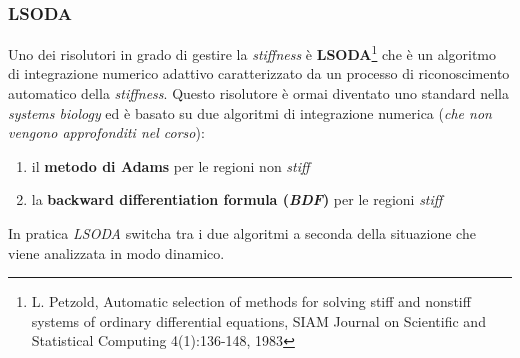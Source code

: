 \documentclass[a4paper,12pt, oneside]{book}
\begin{document}
\subsubsection{LSODA}
Uno dei risolutori in grado di gestire la \textit{stiffness} è
\textbf{LSODA}\footnote{L. Petzold, Automatic selection of methods for solving
  stiff and nonstiff systems of ordinary differential 
equations, SIAM Journal on Scientific and Statistical Computing 4(1):136-148,
1983}  che è un algoritmo di integrazione numerico adattivo caratterizzato da un
processo di riconoscimento automatico della \textit{stiffness}. Questo
risolutore è ormai diventato uno standard nella \textit{systems biology} ed è
basato su due algoritmi di integrazione numerica (\textit{che non vengono
  approfonditi nel corso}):
\begin{enumerate}
  \item il \textbf{metodo di Adams} per le regioni non \textit{stiff}
  \item la \textbf{backward differentiation formula (\textit{BDF})} per le regioni
  \textit{stiff} 
\end{enumerate}
In pratica \textit{LSODA} switcha tra i due algoritmi a seconda della
situazione che viene analizzata in modo dinamico.  
\end{document}
